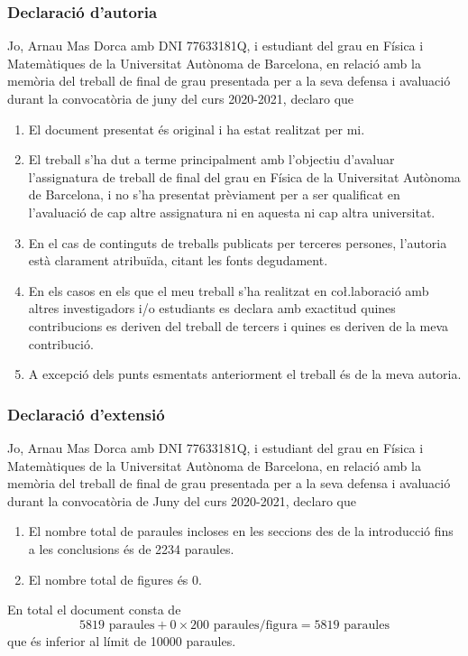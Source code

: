 \thispagestyle{empty}
\begin{otherlanguage}{catalan}
\subsubsection{Declaració d'autoria}
{ \sffamily Jo, Arnau Mas Dorca amb DNI 77633181Q, i estudiant del grau en Física i
	Matemàtiques de la Universitat Autònoma de Barcelona, en relació amb la memòria del
	treball de final de grau presentada per a la seva defensa i avaluació durant la
	convocatòria de juny del curs 2020-2021, declaro que
\begin{enumerate}
	\item El document presentat és original i ha estat realitzat per mi.
	\item El treball s'ha dut a terme principalment amb l'objectiu d'avaluar l'assignatura
		de treball de final del grau en Física de la Universitat Autònoma de Barcelona, i no
		s'ha presentat prèviament per a ser qualificat en l'avaluació de cap altre assignatura
		ni en aquesta ni cap altra universitat.
	\item En el cas de continguts de treballs publicats per terceres persones, l'autoria
		està clarament atribuïda, citant les fonts degudament.
	\item En els casos en els que el meu treball s'ha realitzat en co\l.laboració amb altres
		investigadors i/o estudiants es declara amb exactitud quines contribucions es deriven
		del treball de tercers i quines es deriven de la meva contribució. 
	\item A excepció dels punts esmentats anteriorment el treball és de la meva autoria. 
\end{enumerate}

}

\clearpage
\thispagestyle{empty}
\subsubsection{Declaració d'extensió}
{ \sffamily Jo, Arnau Mas Dorca amb DNI 77633181Q, i estudiant del grau en Física i
	Matemàtiques de la Universitat Autònoma de Barcelona, en relació amb la memòria del
	treball de final de grau presentada per a la seva defensa i avaluació durant la
	convocatòria de Juny del curs 2020-2021, declaro que
\begin{enumerate}
	\item El nombre total de paraules incloses en les seccions des de la introducció fins a
		les conclusions és de \num{2234} paraules. 
	\item El nombre total de figures és 0.
\end{enumerate}
En total el document consta de
\begin{equation*}
	\num{5819}\text{ paraules} + \num{0} \times \num{200}\text{ paraules/figura} =
	\num{5819}\text{ paraules}
\end{equation*}
que és inferior al límit de \num{10000} paraules. 

}
\end{otherlanguage}

